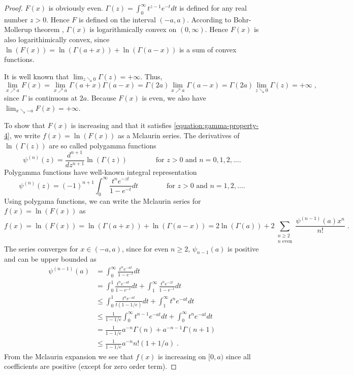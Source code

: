 \begin{proof}
$F(x)$ is obviously even. $\Gamma(z) = \int_0^\infty t^{z-1} e^{-t} dt$ is
defined for any real number $z > 0$. Hence $F$ is defined on the interval
$(-a,a)$. According to Bohr-Mollerup theorem \cite[Theorem 2.1]{Artin-1964},
$\Gamma(x)$ is logarithmically convex on $(0,\infty)$. Hence $F(x)$ is also
logarithimically convex, since $\ln (F(x)) = \ln(\Gamma(a+x)) +
\ln(\Gamma(a-x))$ is a sum of convex functions.

It is well known that $\lim_{z \searrow 0} \Gamma(z) = +\infty$. Thus,
$$
\lim_{x \nearrow a} F(x)
= \lim_{x \nearrow a} \Gamma(a+x) \Gamma(a-x)
= \Gamma(2a) \lim_{x \nearrow a} \Gamma(a-x)
= \Gamma(2a) \lim_{z \searrow 0} \Gamma(z)
= + \infty \; ,
$$
since $\Gamma$ is continuous at $2a$. Because $F(x)$ is even, we also have
$\lim_{x \searrow -a} F(x) = +\infty$.

To show that $F(x)$ is increasing and that it satisfies
\eqref{equation:gamma-property-4}, we write $f(x) = \ln(F(x))$ as a Mclaurin series.
The derivatives of $\ln(\Gamma(z))$ are so called polygamma functions
$$
\psi^{(n)}(z) = \frac{d^{n+1}}{dz^{n+1}} \ln(\Gamma(z))
\qquad \qquad \text{for $z > 0$ and $n=0,1,2,\dots$.}
$$
Polygamma functions have well-known integral representation
$$
\psi^{(n)}(z) = (-1)^{n+1} \int_0^\infty \frac{t^n e^{-zt}}{1 - e^{-t}} dt
\qquad \qquad \text{for $z > 0$ and $n=1,2,\dots$.}
$$
Using polygama functions, we can write the Mclaurin series for $f(x) = \ln(F(x))$ as
$$
f(x) = \ln(F(x)) = \ln(\Gamma(a+x)) + \ln(\Gamma(a-x)) = 2 \ln(\Gamma(a)) + 2 \sum_{\substack{n \ge 2 \\ \text{$n$ even}}} \frac{\psi^{(n-1)}(a) x^n}{n!} \; .
$$
The series converges for $x \in (-a,a)$, since
for even $n \ge 2$, $\psi_{n-1}(a)$ is positive and can be upper bounded as
\begin{align*}
\psi^{(n-1)}(a)
& = \int_0^\infty \frac{t^n e^{-at}}{1 - e^{-t}} dt \\
& = \int_0^1 \frac{t^n e^{-at}}{1 - e^{-t}} dt + \int_1^\infty \frac{t^n e^{-zt}}{1 - e^{-t}} dt \\
& \le \int_0^1 \frac{t^n e^{-at}}{t(1 - 1/e)} dt + \int_1^\infty t^n e^{-at} dt \\
& \le \frac{1}{1 - 1/e} \int_0^\infty t^{n-1} e^{-at} dt + \int_0^\infty t^n e^{-at} dt \\
& = \frac{1}{1 - 1/e} a^{-n} \Gamma(n) + a^{-n-1} \Gamma(n+1) \\
& \le \frac{1}{1 - 1/e} a^{-n} n! (1 + 1/a) \; .
\end{align*}
From the Mclaurin expansion we see that $f(x)$ is increasing on $[0,a)$
since all coefficients are positive (except for zero order term).


\end{proof}
